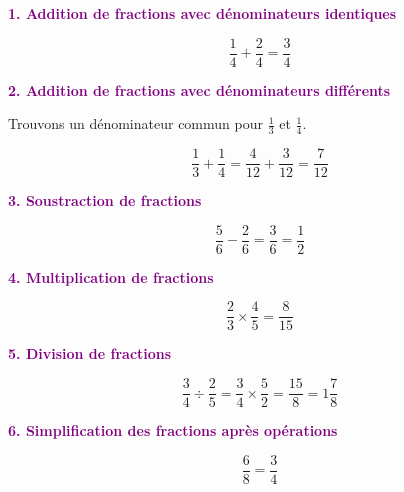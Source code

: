 \documentclass{article}
\begin{document}
\begin{tcolorbox}[colback=orange!10!white, colframe=orange!75!black, title=\textcolor{white}{Exemples d'Opérations}, sharp corners=southwest]
    \textcolor{purple}{\textbf{1. Addition de fractions avec dénominateurs identiques}}
    
    \[
    \frac{1}{4} + \frac{2}{4} = \frac{3}{4}
    \]
    
    \vspace{10pt}
    \textcolor{purple}{\textbf{2. Addition de fractions avec dénominateurs différents}}
    
    Trouvons un dénominateur commun pour \(\frac{1}{3}\) et \(\frac{1}{4}\).
    
    \[
    \frac{1}{3} + \frac{1}{4} = \frac{4}{12} + \frac{3}{12} = \frac{7}{12}
    \]
    
    \vspace{10pt}
    \textcolor{purple}{\textbf{3. Soustraction de fractions}}
    
    \[
    \frac{5}{6} - \frac{2}{6} = \frac{3}{6} = \frac{1}{2}
    \]
    
    \vspace{10pt}
    \textcolor{purple}{\textbf{4. Multiplication de fractions}}
    
    \[
    \frac{2}{3} \times \frac{4}{5} = \frac{8}{15}
    \]
    
    \vspace{10pt}
    \textcolor{purple}{\textbf{5. Division de fractions}}
    
    \[
    \frac{3}{4} \div \frac{2}{5} = \frac{3}{4} \times \frac{5}{2} = \frac{15}{8} = 1 \frac{7}{8}
    \]
    
    \vspace{10pt}
    \textcolor{purple}{\textbf{6. Simplification des fractions après opérations}}
    
    \[
    \frac{6}{8} = \frac{3}{4}
    \]
\end{tcolorbox}

\vspace{0.2cm}
\end{document}
